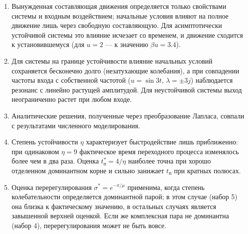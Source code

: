 \documentclass[14pt,a4paper]{extarticle}
\begin{document}
\begin{enumerate}
  \item Вынужденная составляющая движения определяется только свойствами системы и входным воздействием; начальные условия влияют на полное движение лишь через свободную составляющую. Для асимптотически устойчивой системы это влияние исчезает со временем, и движение сходится к установившемуся (для $u = 2$ — к значению $\beta u = 3.4$).
  \item Для системы на границе устойчивости влияние начальных условий сохраняется бесконечно долго (незатухающие колебания), а при совпадении частоты входа с собственной частотой ($u = \sin 3t$, $\lambda = \pm 3j$) наблюдается резонанс с линейно растущей амплитудой. Для неустойчивой системы выход неограниченно растет при любом входе.
  \item Аналитические решения, полученные через преобразование Лапласа, совпали с результатами численного моделирования.
  \item Степень устойчивости $\eta$ характеризует быстродействие лишь приближенно: при одинаковом $\eta = 9$ фактическое время переходного процесса изменялось более чем в два раза. Оценка $t_\text{п}^* = 4/\eta$ наиболее точна при хорошо отделенном доминантном корне и сильно занижает $t_\text{п}$ при кратных полюсах.
  \item Оценка перерегулирования $\sigma^* = e^{-\pi/\mu}$ применима, когда степень колебательности определяется доминантной парой; в этом случае (набор 5) она близка к фактическому значению, в остальных случаях является завышенной верхней оценкой. Если же комплексная пара не доминантна (набор 4), перерегулирования может не быть вовсе.
\end{enumerate}
\end{document}
